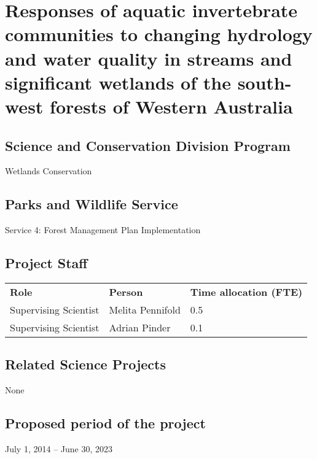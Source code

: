 \documentclass[version=last,
    paper=a4, %
    10pt, %
    usenames,
    dvipsnames,
    oneside, %
    headings=openany, %
    DIV=15 %
]{scrbook}
\begin{document}
\frontmatter
\maketitle
\mainmatter



\section*{Responses of aquatic invertebrate communities to changing hydrology and
water quality in streams and significant wetlands of the south-west
forests of Western Australia
}


\subsection*{Science and Conservation Division Program}
Wetlands Conservation



\subsection*{Parks and Wildlife Service}
Service 4: Forest Management Plan Implementation


\subsection*{Project Staff}
\begin{tabu} {X X X}
\textbf{Role} & \textbf{Person} & \textbf{Time allocation (FTE)}\\

Supervising Scientist & Melita  Pennifold & 0.5\\

Supervising Scientist & Adrian  Pinder & 0.1\\

\end{tabu}



\subsection*{Related Science Projects}
None


\subsection*{Proposed period of the project}
July 1, 2014 -- June 30, 2023
\end{document}
